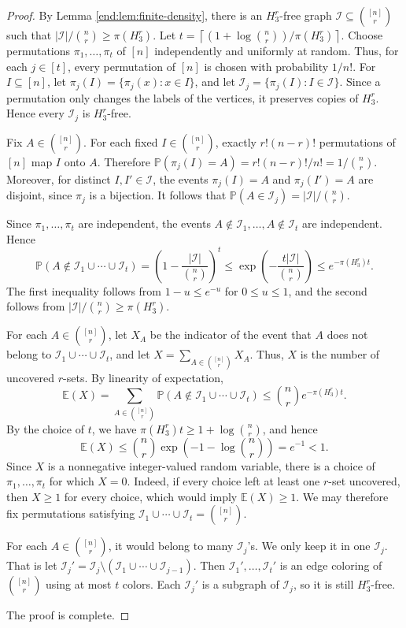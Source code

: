 \documentclass[10pt,a4paper]{amsart}
\numberwithin{equation}{section}
\begin{document}
\begin{proof}
By Lemma \ref{end:lem:finite-density}, there is an $H_3^r$-free graph  $\mathcal I\subseteq\binom{[n]}r$ such that $|\mathcal I|/\binom nr\ge\pi(H_3^r)$.  Let
$t=\left\lceil(1+\log\binom nr)/\pi(H_3^r)\right\rceil$.
Choose permutations $\pi_1,\ldots,\pi_t$ of $[n]$ independently and uniformly at random.  Thus, for each $j\in[t]$, every permutation of $[n]$ is chosen with probability $1/n!$.  For $I\subseteq[n]$, let $\pi_j(I)=\{\pi_j(x):x\in I\}$, and let $\mathcal I_j=\{\pi_j(I):I\in\mathcal I\}$.  Since a permutation only changes the labels of the vertices, it preserves copies of $H_3^r$.  Hence every $\mathcal I_j$ is $H_3^r$-free.

Fix $A\in\binom{[n]}r$.  For each fixed $I\in\binom{[n]}r$, exactly $r!(n-r)!$ permutations of $[n]$ map $I$ onto $A$. 
Therefore $\mathbb{P}(\pi_j(I)=A)=r!(n-r)!/n!=1/\binom nr$.
Moreover, for distinct $I,I'\in\mathcal I$, the events $\pi_j(I)=A$ and $\pi_j(I')=A$ are disjoint, since $\pi_j$ is a bijection.  
It follows that $\mathbb{P}(A\in\mathcal I_j)=|\mathcal I|/\binom nr$.

Since $\pi_1,\ldots,\pi_t$ are independent, the events $A\notin\mathcal I_1,\ldots,A\notin\mathcal I_t$ are independent.  Hence
$$ \mathbb{P}(A\notin\mathcal I_1\cup\cdots\cup\mathcal I_t)
 =\left(1-\frac{|\mathcal I|}{\binom nr}\right)^t
 \le \exp\left(-\frac{t|\mathcal I|}{\binom nr}\right)
 \le e^{-\pi(H_3^r)t}.$$
The first inequality follows from $1-u\le e^{-u}$ for $0\le u\le1$, and the second follows from $|\mathcal I|/\binom nr\ge\pi(H_3^r)$.

For each $A\in\binom{[n]}r$, let $X_A$ be the indicator of the event that $A$ does not belong to $\mathcal I_1\cup\cdots\cup\mathcal I_t$, and let $X=\sum_{A\in\binom{[n]}r}X_A$.  Thus, $X$ is the number of uncovered $r$-sets.  By linearity of expectation,
$$ \mathbb{E}(X)
 =\sum_{A\in\binom{[n]}r}\mathbb{P}(A\notin\mathcal I_1\cup\cdots\cup\mathcal I_t)
 \le\binom nr e^{-\pi(H_3^r)t}.$$
By the choice of $t$, we have $\pi(H_3^r)t\ge1+\log\binom nr$, and hence
$$ \mathbb{E}(X)\le\binom nr\exp\left(-1-\log\binom nr\right)=e^{-1}<1.$$
Since $X$ is a nonnegative integer-valued random variable, there is a choice of $\pi_1,\ldots,\pi_t$ for which $X=0$.  
Indeed, if every choice left at least one $r$-set uncovered, then $X\ge1$ for every choice, 
which would imply $\mathbb{E}(X)\ge1$.  
We may therefore fix permutations satisfying
$\mathcal I_1\cup\cdots\cup\mathcal I_t=\binom{[n]}r$.

For each $A\in\binom{[n]}r$, it would belong to many $\mathcal I_j$'s. We only keep it in one $\mathcal I_j$. That is let $\mathcal I_j'=\mathcal I_j\setminus (\mathcal I_1\cup \cdots \cup \mathcal I_{j-1}) $. Then  $\mathcal I_1',\ldots,\mathcal I_t'$ is an edge coloring of $\binom{[n]}{r}$ using at most $t$ colors. Each $\mathcal{I}_j'$ is a subgraph of $\mathcal{I}_j$, so it is still $H_3^r$-free. 

The proof is complete.
\end{proof}
\end{document}
